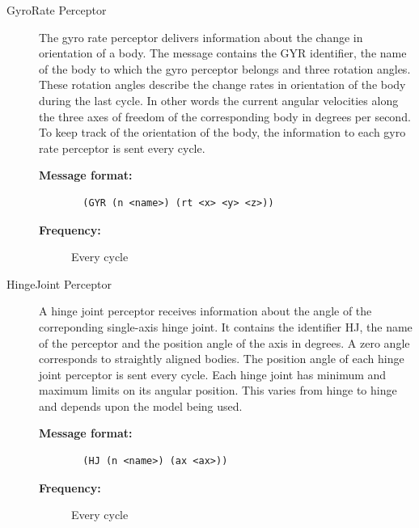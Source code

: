 \begin{description}
  \item [GyroRate Perceptor]
  The gyro rate perceptor delivers information about the change in orientation of a body. The message contains the GYR identifier, the name of the body to which the gyro perceptor belongs and three rotation angles. These rotation angles describe the change rates in orientation of the body during the last cycle. In other words the current angular velocities along the three axes of freedom of the corresponding body in degrees per second. To keep track of the orientation of the body, the information to each gyro rate perceptor is sent every cycle.
  \begin{description}
  \item[{\bf Message format:}]
  \begin{verbatim}
  (GYR (n <name>) (rt <x> <y> <z>))
  \end{verbatim}
  \item[{\bf Frequency:}]
  Every cycle
  \end{description}




  \item [HingeJoint Perceptor]
  A hinge joint perceptor receives information about the angle of the correponding single-axis hinge joint. It contains the identifier HJ, the name of the perceptor and the position angle of the axis in degrees. A zero angle corresponds to straightly aligned bodies. The position angle of each hinge joint perceptor is sent every cycle.
Each hinge joint has minimum and maximum limits on its angular position. This varies from hinge to hinge and depends upon the model being used.  \begin{description}
  \item[{\bf Message format:}]
  \begin{verbatim}
  (HJ (n <name>) (ax <ax>))
  \end{verbatim}
  \item[{\bf Frequency:}]
  Every cycle
  \end{description}
  
  
  

\end{description}
